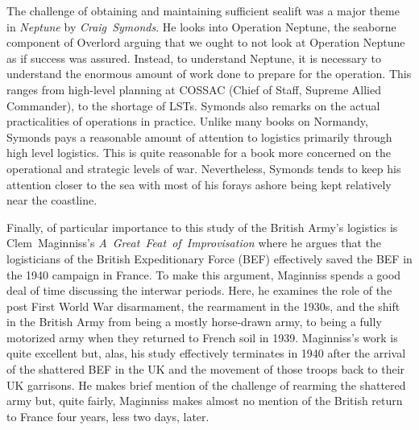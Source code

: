 \documentclass[noraggedright]{turabian-researchpaper}
\begin{document}
The challenge of obtaining and maintaining sufficient sealift was a major 
theme in \textit{Neptune} by \mbox{\textit{Craig Symonds}}.  He looks into 
Operation Neptune, the seaborne component of Overlord arguing that we ought to
not look at Operation Neptune as if success was assured.\autocite[xvi]{Neptune}
Instead, to understand Neptune, it is necessary to understand the enormous 
amount of work done to prepare for the operation.  This ranges from high-level
planning at COSSAC (Chief of Staff, Supreme Allied Commander), to the shortage 
of LSTs.  Symonds also remarks on the actual practicalities of operations in 
practice.\autocite[166-7]{Neptune}
Unlike many books on Normandy, Symonds pays a reasonable amount of attention 
to logistics primarily through high level logistics.  This is quite 
reasonable for a book more concerned on the operational and strategic levels 
of war.  %
Nevertheless, Symonds tends to keep his attention closer to the sea with most 
of his forays ashore being kept relatively near the 
coastline.

Finally, of particular importance to this study of the British Army's logistics
is \mbox{Clem Maginniss's} \mbox{\textit{A Great Feat of Improvisation}} 
where he argues that the logisticians of the British Expeditionary Force (BEF) 
effectively saved the BEF in the 1940 campaign in France.\autocite[1]{feat} 
To make this argument, Maginniss spends a good deal of time discussing the 
interwar periods.  Here, he examines the role of the post First World War 
disarmament, the rearmament in the 1930s, and the shift in the British Army 
from being a mostly horse-drawn army, to being a fully motorized army when 
they returned to French soil in 1939.\autocite[Part 1]{feat}
Maginniss's work is quite excellent but, alas, his study effectively 
terminates in 1940 after the arrival of the shattered BEF in the UK and the 
movement of those troops back to their UK 
garrisons.  He makes brief mention of the challenge of rearming the shattered 
army but, quite fairly, Maginniss makes almost no mention of the British return 
to France four years, less two days, later.\autocite[531]{feat}

\end{document}

